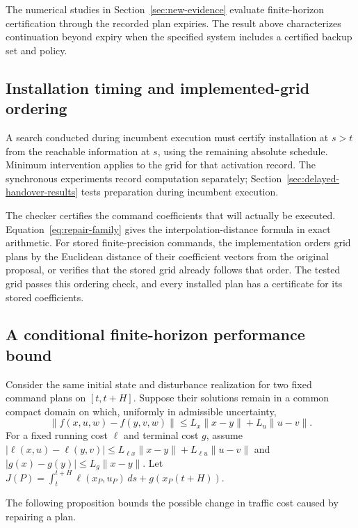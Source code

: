 The numerical studies in Section~\ref{sec:new-evidence} evaluate
finite-horizon certification through the recorded plan expiries. The result
above characterizes continuation beyond expiry when the specified system
includes a certified backup set and policy.

\subsection{Installation timing and implemented-grid ordering}

A search conducted during incumbent execution must certify installation
at $s>t$ from the reachable information at $s$, using the remaining absolute
schedule. Minimum intervention applies to the grid for that activation
record. The synchronous experiments record computation separately;
Section~\ref{sec:delayed-handover-results} tests preparation during
incumbent execution.

The checker certifies the command coefficients that will actually be
executed. Equation~\eqref{eq:repair-family} gives the interpolation-distance
formula in exact arithmetic. For stored finite-precision commands, the
implementation orders grid plans by the Euclidean distance of their
coefficient vectors from the original proposal, or verifies that the stored
grid already follows that order. The tested grid passes this ordering check,
and every installed plan has a certificate for its stored coefficients.

\subsection{A conditional finite-horizon performance bound}
Consider the same initial state and disturbance realization for two fixed
command plans on $[t,t+H]$. Suppose their solutions remain in a common
compact domain on which, uniformly in admissible uncertainty,
\[
\|f(x,u,w)-f(y,v,w)\|
\le L_x\|x-y\|+L_u\|u-v\|.
\]
For a fixed running cost $\ell$ and terminal cost $g$, assume
$|\ell(x,u)-\ell(y,v)|\le L_{\ell x}\|x-y\|+
L_{\ell u}\|u-v\|$ and $|g(x)-g(y)|\le L_g\|x-y\|$.
Let $J(P)=\int_t^{t+H}\ell(x_P,u_P)\,ds+g(x_P(t+H))$.

The following proposition bounds the possible change in traffic cost caused by repairing a plan.

